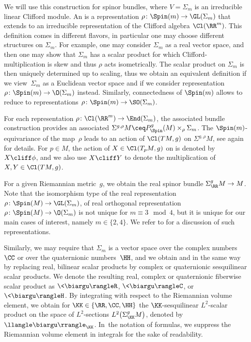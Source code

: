 We will use this construction for spinor bundles, where $V= \Sigma_m$ is an irreducible linear Clifford module.
An  is a representation $\rho\colon\Spin(m)\to \GL(\Sigma_m)$ that extends to an irreducible representation of the Clifford algebra $\Cl(\RR^m)$.
This definition comes in different flavors, in particular one may choose different structures on $\Sigma_m$. For example, one may consider $\Sigma_m$ as a real vector space, and then one may show that $\Sigma_m$ has a scalar product for which Clifford-multiplication is skew and thus $\rho$ acts isometrically.
The scalar product on $\Sigma_m$ is then uniquely determined up to scaling, thus we obtain an equivalent definition if we view~$\Sigma_m$ as a Euclidean vector space and if we consider representation $\rho\colon\Spin(m)\to \O(\Sigma_m)$ instead. Similarly, connectedness of $\Spin(m)$ allows to reduce to representations $\rho\colon\Spin(m)\to \SO(\Sigma_m)$.

For each representation $\rho\colon\Cl(\RR^m)\to \End(\Sigma_m)$, the associated bundle construction provides an associated  $\Sigma^{g,\rho} M\ceq P^g_\Spin(M)\times_\rho\Sigma_m$. The $\Spin(m)$-equivariance of the map~$\rho$ leads to an action of $\Cl(TM,g)$ on $\Sigma^{g,\rho} M$, see again \cite{friedrich-book,lawson.michelsohn:89} for details. For $p\in M$, the action of $X\in \Cl(T_pM,g)$ on  is denoted by $X\cliff \phi$, and we also use $X\cliff Y$ to denote the multiplication of $X,Y\in\Cl(TM,g)$.

For a given Riemannian metric~$g$, we obtain the real spinor bundle $\Sigma^g_\RR M\to M$.
Note that the isomorphism type of the real representation $\rho\colon\Spin(M)\to \GL(\Sigma_m)$, of real orthogonal representation $\rho\colon\Spin(M)\to \O(\Sigma_m)$ is not unique for $m\equiv 3\mod 4$, but it is unique for our main cases of interest, namely $m\in \{2,4\}$. We refer to \cite[Chapter~I, Section~5]{lawson.michelsohn:89} for a discussion of such representations.

Similarly, we may require that $\Sigma_m$ is a vector space over the complex numbers~$\CC$ or over the quaternionic numbers~$\HH$,
and we obtain  and 
in the same way by replacing real, bilinear scalar products by complex or quaternionic sesquilinear scalar products.
We denote the resulting real, complex or quaternionic fiberwise scalar product as $\<\biargu\rangleR$, $\<\biargu\rangleC$, or $\<\biargu\rangleH$.
By integrating with respect to the Riemannian volume element, we obtain for $\KK\in \{\RR,\CC,\HH\}$
the $\KK$-sesquilinear $L^2$-scalar product on the space of $L^2$-sections $L^2\bigl(\Sigma^g_\KK M\bigr)$, denoted by $\llangle\biargu\rrangle_\KK$. In~the notation of formulas, we suppress the Riemannian volume element in integrals for the sake of readability.

